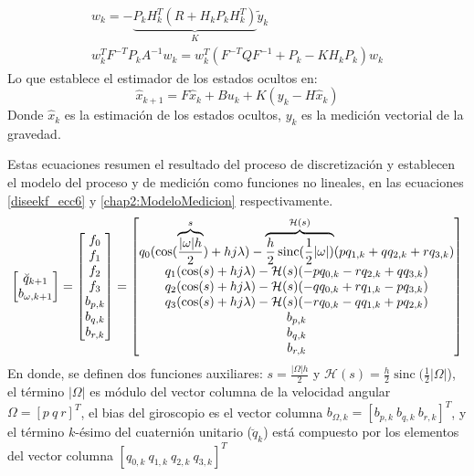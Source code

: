 \documentclass[conference]{IEEEtran}
\DeclareMathOperator{\sinc}{sinc}
\begin{document}
\begin{gather}
w_{k}=-\underbrace{P_kH_k^T(R+H_kP_kH_k^T)}_K\tilde{y}_k\\
w_k^TF^{-T}P_kA^{-1}w_k=w_k^T(F^{-T}QF^{-1}+P_k-KH_kP_k)w_k
\end{gather}
Lo que establece el estimador de los estados ocultos en:
\begin{equation}\label{chap2:ObservadorLineal}
\hat{x}_{k+1}=F\hat{x}_k+Bu_{k}+K(y_k-H\hat{x}_k)
\end{equation}
Donde $\hat{x}_k$ es la estimación de los estados ocultos, $y_k$ es la medición vectorial de la gravedad. \par
Estas ecuaciones resumen el resultado del proceso de discretización y establecen el modelo del proceso y de medición como funciones no lineales, en las ecuaciones \eqref{diseekf_ecc6} y \eqref{chap2:ModeloMedicion} respectivamente.
\begin{equation}\label{diseekf_ecc6}\small{
\begin{bmatrix}\breve{q}_{k+1}\\b_{\omega,k+1}\end{bmatrix}=
\begin{bmatrix}f_0\\f_1\\f_2\\f_3\\b_{p,k}\\b_{q,k}\\b_{r,k}\end{bmatrix}=
\begin{bmatrix}q_0(\cos(\overbrace{\frac{|\omega|h}{2}}^s)+hj\lambda)-\overbrace{\frac{h}{2}\sinc (\frac{1}{2} |\omega|)}^{\mathcal{H}(s)}(pq_{1,k}+qq_{2,k}+rq_{3,k})\\q_1(\cos(s)+hj\lambda)-\mathcal{H}(s) (-pq_{0,k}-rq_{2,k}+qq_{3,k})\\q_2(\cos(s)+hj\lambda)-\mathcal{H}(s) (-qq_{0,k}+rq_{1,k}-pq_{3,k})\\q_3(\cos(s)+hj\lambda)-\mathcal{H}(s) (-rq_{0,k}-qq_{1,k}+pq_{2,k})\\b_{p,k}\\b_{q,k}\\b_{r,k}\end{bmatrix}}
\end{equation}
En donde, se definen dos funciones auxiliares: $s=\frac{|\Omega| h}{2}$ y $\mathcal{H}(s)=\frac{h}{2}\sinc (\frac{1}{2} |\Omega|$), el término $|\Omega|$ es módulo del vector columna de la velocidad angular $\Omega=[p~q~r]^T$, el bias del giroscopio es el vector columna $b_{\Omega,k}=[b_{p,k}~b_{q,k}~b_{r,k}]^T$, y el término $k$-ésimo del cuaternión unitario ($\breve{q}_k$) está compuesto por los elementos del vector columna $[q_{0,k}~q_{1,k}~q_{2,k}~q_{3,k}]^T$\par
\end{document}
